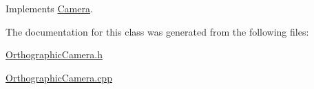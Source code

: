 Implements \hyperlink{classCamera_a476000c8588b1aef575482c86153fcb7}{Camera}.



The documentation for this class was generated from the following files\+:\begin{DoxyCompactItemize}
\item 
\hyperlink{OrthographicCamera_8h}{Orthographic\+Camera.\+h}\item 
\hyperlink{OrthographicCamera_8cpp}{Orthographic\+Camera.\+cpp}\end{DoxyCompactItemize}
